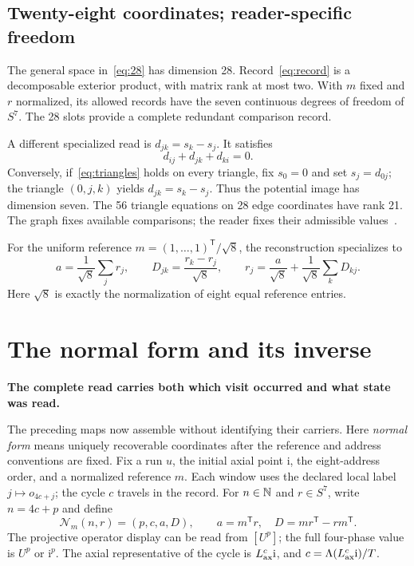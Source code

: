 \documentclass[11pt]{article}
\theoremstyle{definition}\newtheorem{definition}[theorem]{Definition}
\newcommand{\mi}{\mathrm i}\newcommand{\tr}{\mathsf T}
\newcommand{\lead}[1]{\textbf{#1}\par}
\newcommand{\page}{\clearpage}
\begin{document}
\subsection{Twenty-eight coordinates; reader-specific freedom}
The general space in~\eqref{eq:28} has dimension 28. Record~\eqref{eq:record} is a decomposable exterior product, with matrix rank at most two. With $m$ fixed and $r$ normalized, its allowed records have the seven continuous degrees of freedom of $S^7$. The 28 slots provide a complete redundant comparison record.

A different specialized read is $d_{jk}=s_k-s_j$. It satisfies
\begin{equation}
 d_{ij}+d_{jk}+d_{ki}=0.
 \label{eq:triangles}
\end{equation}
Conversely, if~\eqref{eq:triangles} holds on every triangle, fix $s_0=0$ and set $s_j=d_{0j}$; the triangle $(0,j,k)$ yields $d_{jk}=s_k-s_j$. Thus the potential image has dimension seven. The 56 triangle equations on 28 edge coordinates have rank 21. The graph fixes available comparisons; the reader fixes their admissible values~\cite[\S5]{LM11}.

For the uniform reference $m=(1,\ldots,1)^\tr/\sqrt8$, the reconstruction specializes to
\begin{equation}
 a=\frac{1}{\sqrt8}\sum_jr_j,\qquad D_{jk}=\frac{r_k-r_j}{\sqrt8},\qquad r_j=\frac a{\sqrt8}+\frac1{\sqrt8}\sum_kD_{kj}.
\end{equation}
Here $\sqrt8$ is exactly the normalization of eight equal reference entries.

\page
\section{The normal form and its inverse}
\lead{The complete read carries both which visit occurred and what state was read.}
The preceding maps now assemble without identifying their carriers. Here \emph{normal form} means uniquely recoverable coordinates after the reference and address conventions are fixed. Fix a run $u$, the initial axial point $\mi$, the eight-address order, and a normalized reference $m$. Each window uses the declared local label $j\mapsto o_{4c+j}$; the cycle $c$ travels in the record. For $n\in\mathbb N$ and $r\in S^7$, write $n=4c+p$ and define
\begin{equation}
 \mathcal N_m(n,r)=(p,c,a,D),\qquad a=m^\tr r,\quad D=mr^\tr-rm^\tr.
 \label{eq:nf}
\end{equation}
The projective operator display can be read from $[U^p]$; the full four-phase value is $U^p$ or $\mi^p$. The axial representative of the cycle is $L_{\ax}^{c}\mi$, and $c=\Lambda(L_{\ax}^{c}\mi)/T$.
\end{document}
